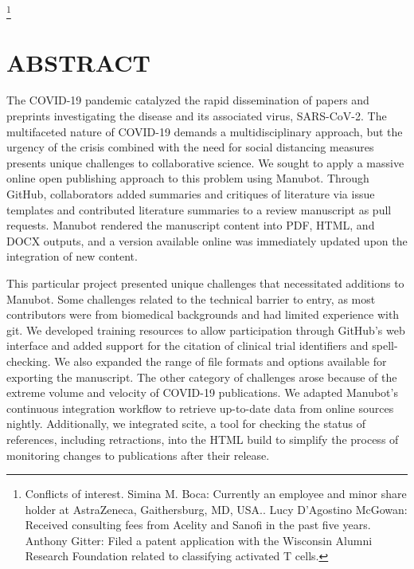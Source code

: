 \documentclass[twocolumn]{ceurart}
\begin{document}


\maketitle

{\let\thefootnote\relax\footnote{Conflicts of interest. Simina M. Boca: Currently an employee and minor share holder at AstraZeneca, Gaithersburg, MD, USA.. Lucy D'Agostino McGowan: Received consulting fees from Acelity and Sanofi in the past five years. Anthony Gitter: Filed a patent application with the Wisconsin Alumni Research Foundation related to classifying activated T cells.}}

\hypertarget{abstract}{%
\section{ABSTRACT}\label{abstract}}

The COVID-19 pandemic catalyzed the rapid dissemination of papers and preprints investigating the disease and its associated virus, SARS-CoV-2.
The multifaceted nature of COVID-19 demands a multidisciplinary approach, but the urgency of the crisis combined with the need for social distancing measures presents unique challenges to collaborative science.
We sought to apply a massive online open publishing approach to this problem using Manubot.
Through GitHub, collaborators added summaries and critiques of literature via issue templates and contributed literature summaries to a review manuscript as pull requests.
Manubot rendered the manuscript content into PDF, HTML, and DOCX outputs, and a version available online was immediately updated upon the integration of new content.

This particular project presented unique challenges that necessitated additions to Manubot.
Some challenges related to the technical barrier to entry, as most contributors were from biomedical backgrounds and had limited experience with git.
We developed training resources to allow participation through GitHub's web interface and added support for the citation of clinical trial identifiers and spell-checking.
We also expanded the range of file formats and options available for exporting the manuscript.
The other category of challenges arose because of the extreme volume and velocity of COVID-19 publications.
We adapted Manubot's continuous integration workflow to retrieve up-to-date data from online sources nightly.
Additionally, we integrated scite, a tool for checking the status of references, including retractions, into the HTML build to simplify the process of monitoring changes to publications after their release.
\end{document}
